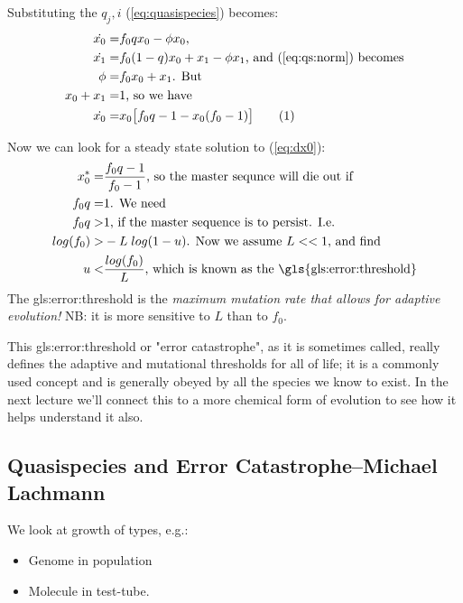 \documentclass[]{article}
\newcommand\numberthis{\addtocounter{equation}{1}\tag{\theequation}}
\begin{document}
Substituting the $q_j,i$ (\ref{eq:quasispecies}) becomes:
\begin{align*}
	\dot{x_0}=&f_0 q x_0 - \phi x_0\text{,}\\
	\dot{x_1}=&f_0 (1-q) x_0 + x_1 -\phi x_1\text{, and (\ref{eq:qs:norm}) becomes}\\
	\phi =& f_0 x_0 + x_1 \text{. But} \\
	x_0 + x_1 =& 1\text{, so we have}\\
	\dot{x_0}=& x_0 \big[f_0 q -1 - x_0 (f_0 - 1)\big] \numberthis \label{eq:dx0}
\end{align*}

Now we can look for a steady state solution to (\ref{eq:dx0}):
\begin{align*}
	x_0^* =& \frac{f_0 q - 1}{f_0 - 1} \text{, so the master sequnce will die out if}\\
	f_0 q =& 1 \text{. We need}\\
	f_0q >& 1 \text{, if the master sequence is to persist. I.e.}\\
	log(f_0) >& -L\; log(1-u)\text{. Now we assume $L<<1$, and find}\\
	u <& \frac{log(f_0)}{L}\text{, which is known as the \gls{gls:error:threshold}} 
\end{align*}
The \gls{gls:error:threshold} is the \emph{maximum mutation rate that allows for adaptive evolution!} NB: it is more sensitive to $L$ than to $f_0$.

This \gls{gls:error:threshold} or "error catastrophe", as it is sometimes called, really defines the adaptive and mutational thresholds for all of life; it is a commonly used concept and is generally obeyed by all the species we know to exist. In the next lecture we'll connect this to a more chemical form of evolution to see how it helps understand it also.
\subsection[Quasispecies and Error Catastrophe]{Quasispecies and Error Catastrophe--Michael Lachmann}

We look at growth of types, e.g.:
\begin{itemize}
	\item Genome in population
	\item Molecule in test-tube.
\end{itemize}
\end{document}
